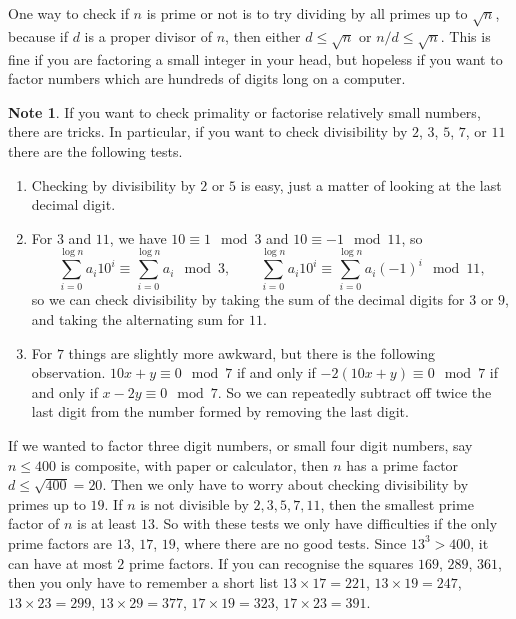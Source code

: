 \documentclass{article}
\newcommand{\rb}[1]{\left( #1 \right)}
\theoremstyle{definition}\newtheorem{definition}{Definition}
\theoremstyle{definition}\newtheorem*{remark}{Remark}
\theoremstyle{definition}\newtheorem*{example}{Example}
\theoremstyle{definition}\newtheorem*{note}{Note}
\begin{document}
One way to check if $ n $ is prime or not is to try dividing by all primes up to $ \sqrt{n} $, because if $ d $ is a proper divisor of $ n $, then either $ d \le \sqrt{n} $ or $ n / d \le \sqrt{n} $. This is fine if you are factoring a small integer in your head, but hopeless if you want to factor numbers which are hundreds of digits long on a computer.

\begin{note}
If you want to check primality or factorise relatively small numbers, there are tricks. In particular, if you want to check divisibility by $ 2 $, $ 3 $, $ 5 $, $ 7 $, or $ 11 $ there are the following tests.
\begin{enumerate}
\item Checking by divisibility by $ 2 $ or $ 5 $ is easy, just a matter of looking at the last decimal digit.
\item For $ 3 $ and $ 11 $, we have $ 10 \equiv 1 \mod 3 $ and $ 10 \equiv -1 \mod 11 $, so
$$ \sum_{i = 0}^{\log n} a_i10^i \equiv \sum_{i = 0}^{\log n} a_i \mod 3, \qquad \sum_{i = 0}^{\log n} a_i10^i \equiv \sum_{i = 0}^{\log n} a_i\rb{-1}^i \mod 11, $$
so we can check divisibility by taking the sum of the decimal digits for $ 3 $ or $ 9 $, and taking the alternating sum for $ 11 $.
\item For $ 7 $ things are slightly more awkward, but there is the following observation. $ 10x + y \equiv 0 \mod 7 $ if and only if $ -2\rb{10x + y} \equiv 0 \mod 7 $ if and only if $ x - 2y \equiv 0 \mod 7 $. So we can repeatedly subtract off twice the last digit from the number formed by removing the last digit.
\end{enumerate}
\end{note}

If we wanted to factor three digit numbers, or small four digit numbers, say $ n \le 400 $ is composite, with paper or calculator, then $ n $ has a prime factor $ d \le \sqrt{400} = 20 $. Then we only have to worry about checking divisibility by primes up to $ 19 $. If $ n $ is not divisible by $ 2, 3, 5, 7, 11 $, then the smallest prime factor of $ n $ is at least $ 13 $. So with these tests we only have difficulties if the only prime factors are $ 13 $, $ 17 $, $ 19 $, where there are no good tests. Since $ 13^3 > 400 $, it can have at most $ 2 $ prime factors. If you can recognise the squares $ 169 $, $ 289 $, $ 361 $, then you only have to remember a short list $ 13 \times 17 = 221 $, $ 13 \times 19 = 247 $, $ 13 \times 23 = 299 $, $ 13 \times 29 = 377 $, $ 17 \times 19 = 323 $, $ 17 \times 23 = 391 $.
\end{document}
